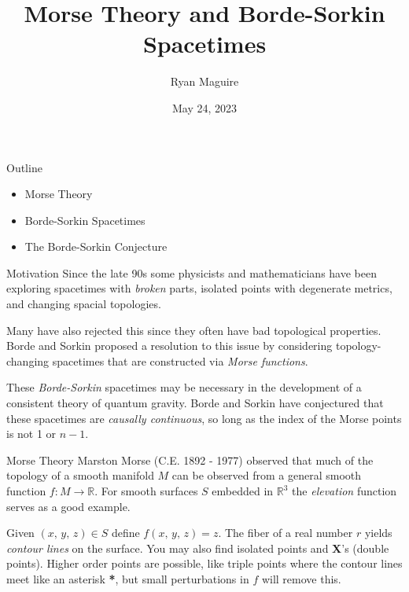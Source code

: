 \documentclass{beamer}
\title{Morse Theory and Borde-Sorkin Spacetimes}
\author{Ryan Maguire}
\date{May 24, 2023}
\begin{document}
    \maketitle
    \begin{frame}{Outline}
        \begin{itemize}
            \item Morse Theory
            \item Borde-Sorkin Spacetimes
            \item The Borde-Sorkin Conjecture
        \end{itemize}
    \end{frame}
    \begin{frame}{Motivation}
        Since the late 90s some physicists and mathematicians have been
        exploring spacetimes with \textit{broken} parts, isolated points with
        degenerate metrics, and changing spacial topologies.
        \par\hfill\par
        Many have also rejected this since they often have bad topological
        properties. Borde and Sorkin proposed a resolution to this issue by
        considering topology-changing spacetimes that are constructed via
        \textit{Morse functions}.
        \par\hfill\par
        These \textit{Borde-Sorkin} spacetimes may be necessary in the
        development of a consistent theory of quantum gravity. Borde and Sorkin
        have conjectured that these spacetimes are \textit{causally continuous},
        so long as the index of the Morse points is not 1 or $n-1$.
    \end{frame}
    \begin{frame}{Morse Theory}
        Marston Morse (C.E. 1892 - 1977) observed that much of the topology of
        a smooth manifold $M$ can be observed from a general smooth function
        $f:M\rightarrow\mathbb{R}$. For smooth surfaces $S$ embedded in
        $\mathbb{R}^{3}$ the \textit{elevation} function serves as a good
        example.
        \par\hfill\par
        Given $(x,\,y,\,z)\in{S}$ define $f(x,\,y,\,z)=z$. The fiber of a real
        number $r$ yields \textit{contour lines} on the surface. You may also
        find isolated points and \textbf{X}'s (double points). Higher order
        points are possible, like triple points where the contour lines meet
        like an asterisk \textbf{*}, but small perturbations in $f$ will
        remove this.
    \end{frame}
\end{document}
